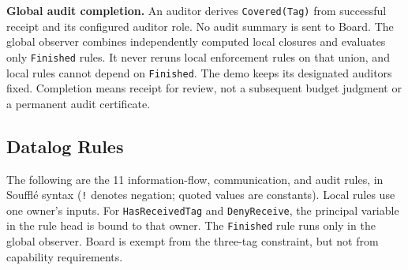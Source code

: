 \documentclass[10pt]{article}
\begin{document}
\textbf{Global audit completion.} An auditor derives \texttt{Covered(Tag)} from
successful receipt and its configured auditor role. No audit summary is sent to Board.
The global observer combines independently computed local closures and evaluates
only \texttt{Finished} rules. It never reruns local enforcement rules on that union,
and local rules cannot depend on \texttt{Finished}. The demo keeps its designated
auditors fixed. Completion means receipt for review, not a subsequent
budget judgment or a permanent audit certificate.

\subsection{Datalog Rules}

The following are the 11 information-flow, communication, and audit rules, in Souffl\'e syntax (\texttt{!} denotes
negation; quoted values are constants). Local rules use one owner's inputs.
For \texttt{HasReceivedTag} and \texttt{DenyReceive}, the principal variable in the rule head
is bound to that owner. The \texttt{Finished} rule runs only in the global observer. Board is exempt
from the three-tag constraint, but not from capability requirements.
\end{document}
